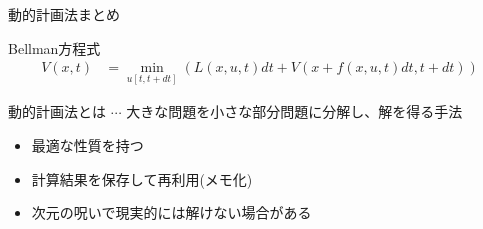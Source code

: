 \documentclass[twocolumn, dvipdfmx,12pt]{beamer}
\begin{document}
    \begin{frame}{動的計画法まとめ}
        \scriptsize

        \begin{block}{Bellman方程式}
            \begin{align*}
                V(x, t) &= \min_{u[t, t+dt]} \left( L(x, u, t) dt + V \left( x + f(x, u, t) dt, t + dt \right) \right)
            \end{align*}
        \end{block}

        動的計画法とは $\cdots$ 大きな問題を小さな部分問題に分解し、解を得る手法

        \begin{itemize}
            \item 最適な性質を持つ
            \item 計算結果を保存して再利用(メモ化)
            \item 次元の呪いで現実的には解けない場合がある
        \end{itemize}
    \end{frame}
\end{document}
